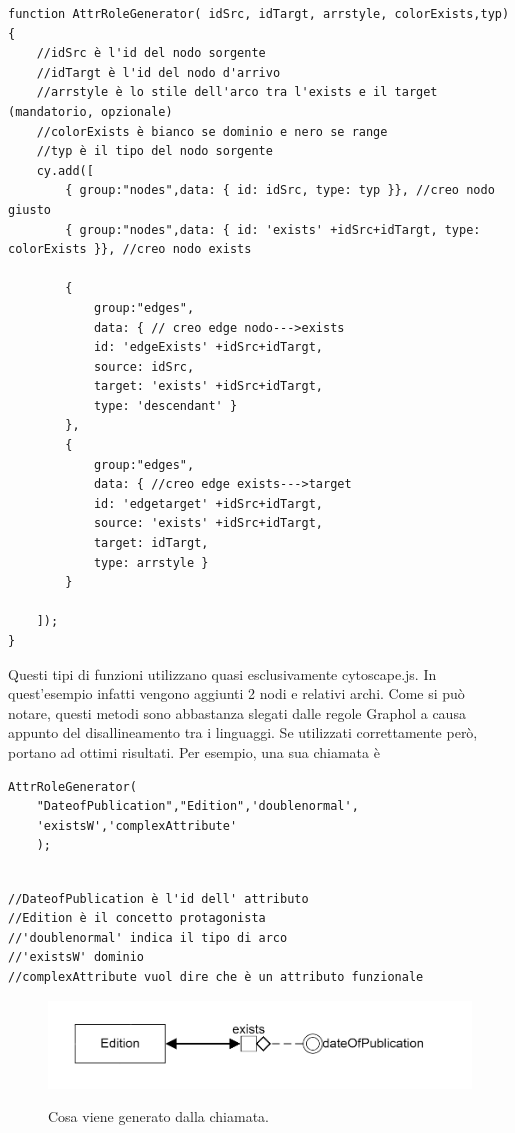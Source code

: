 \documentclass[Lau,binding=0.6cm]{sapthesis}
\begin{document}
\begin{verbatim}
function AttrRoleGenerator( idSrc, idTargt, arrstyle, colorExists,typ){ 
	//idSrc è l'id del nodo sorgente
	//idTargt è l'id del nodo d'arrivo
	//arrstyle è lo stile dell'arco tra l'exists e il target (mandatorio, opzionale)
	//colorExists è bianco se dominio e nero se range 
	//typ è il tipo del nodo sorgente
    cy.add([
        { group:"nodes",data: { id: idSrc, type: typ }}, //creo nodo giusto
        { group:"nodes",data: { id: 'exists' +idSrc+idTargt, type: colorExists }}, //creo nodo exists

        {   
            group:"edges",
            data: { // creo edge nodo--->exists
            id: 'edgeExists' +idSrc+idTargt, 
            source: idSrc,
            target: 'exists' +idSrc+idTargt,
            type: 'descendant' } 
        },
        { 
            group:"edges",                    
            data: { //creo edge exists--->target
            id: 'edgetarget' +idSrc+idTargt, 
            source: 'exists' +idSrc+idTargt,
            target: idTargt,
            type: arrstyle } 
        }

    ]);
}
\end{verbatim}
Questi tipi di funzioni utilizzano quasi esclusivamente cytoscape.js. In quest'esempio infatti vengono aggiunti 2 nodi e relativi archi. Come si può notare, questi metodi sono abbastanza slegati dalle regole Graphol a causa appunto del disallineamento tra i linguaggi. Se utilizzati correttamente però, portano ad ottimi risultati. Per esempio, una sua chiamata è
\begin{Verbatim}[tabsize=4]
AttrRoleGenerator(
	"DateofPublication","Edition",'doublenormal',
	'existsW','complexAttribute'
	);
\end{Verbatim}
\begin{verbatim}

//DateofPublication è l'id dell' attributo 
//Edition è il concetto protagonista
//'doublenormal' indica il tipo di arco
//'existsW' dominio
//complexAttribute vuol dire che è un attributo funzionale
\end{verbatim}
\begin{figure}[H]
\centering
\includegraphics[width=1\textwidth]{demogen}\\[3ex]
\caption{ Cosa viene generato dalla chiamata. }
\label{fig:largenenough}
\end{figure}
\end{document}
